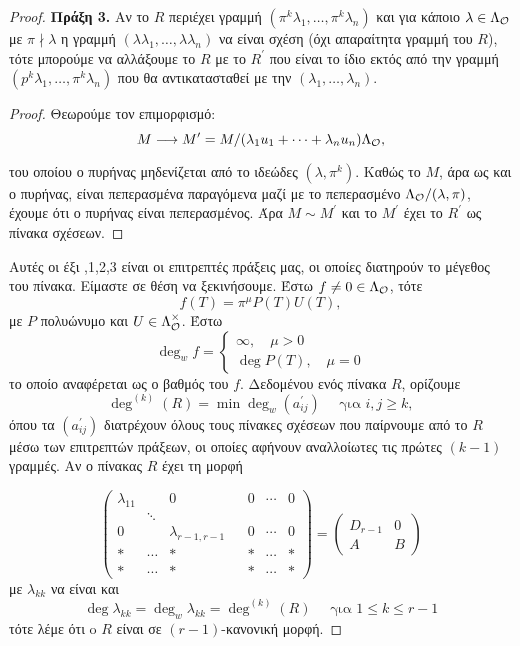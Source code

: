 \begin{proof}
\noindent \textbf{Πράξη 3.} Αν το $R$ περιέχει γραμμή $(\pi^k \lambda_1,\ldots, \pi^k \lambda_n)$ και για κάποιο $\lambda \in \Lambda_\mathcal{O}$ με $\pi\nmid \lambda$ η γραμμή $(\lambda \lambda_1,\ldots, \lambda \lambda_n)$ να είναι σχέση (όχι απαραίτητα γραμμή του $R$), τότε μπορούμε να αλλάξουμε το $R$ με το $R^\prime$ που είναι το ίδιο εκτός από την γραμμή $(p^k \lambda_1,\ldots, \pi^k \lambda_n)$ που θα αντικατασταθεί με την $(\lambda_1,\ldots, \lambda_n)$.

\begin{proof} Θεωρούμε τον επιμορφισμό:
    $$M \longrightarrow M^{\prime} = M/(\lambda_1 u_1 + \cdots + \lambda_n u_n) \Lambda_\mathcal{O} , $$

    \noindent του οποίου ο πυρήνας μηδενίζεται από το ιδεώδες $(\lambda, \pi^k)$. Καθώς το $M$, άρα ως  και ο πυρήνας, είναι πεπερασμένα παραγόμενα μαζί με το πεπερασμένο $\Lambda_\mathcal{O}/(\lambda, \pi)$, έχουμε ότι ο πυρήνας είναι πεπερασμένος. Άρα $M\sim M^\prime$ και το $M^\prime$ έχει το $R^\prime$ ως πίνακα σχέσεων.
\end{proof}

\noindent Αυτές οι έξι ,1,2,3 είναι οι επιτρεπτές πράξεις μας, οι οποίες διατηρούν το μέγεθος του πίνακα. Είμαστε σε θέση να ξεκινήσουμε. Έστω $f\neq 0 \in \Lambda_\mathcal{O}$, τότε
$$f(T) = \pi^\mu P(T)U(T) ,$$ με $P$  πολυώνυμο και $U \in \Lambda_\mathcal{O}^\times$. Έστω 
$$\deg_w f = \begin{cases}
    \infty, \quad \mu > 0 \\
    \deg P(T), \quad \mu = 0
\end{cases}$$
το οποίο αναφέρεται ως ο βαθμός  του $f$. Δεδομένου ενός πίνακα $R$, ορίζουμε
$$\deg^{(k)}(R) = \min \deg_w (a^\prime_{ij}) \quad \text{ για } i,j \geq k ,$$ όπου τα $(a^\prime_{ij})$ διατρέχουν όλους τους πίνακες σχέσεων που παίρνουμε από το $R$ μέσω των επιτρεπτών πράξεων, οι οποίες αφήνουν αναλλοίωτες τις πρώτες $(k-1)$ γραμμές. Αν ο πίνακας $R$ έχει τη μορφή

$$\begin{pmatrix}
    \lambda_{11} & & 0 & & 0 & \cdots & 0 \\ 
    & \ddots& & & & &  \\
    0 & & \lambda_{r-1, r-1} & & 0 & \cdots & 0 \\
    * & \cdots & * & & * & \cdots & * \\ 
    * & \cdots & * & & * & \cdots & * 
\end{pmatrix} = \begin{pmatrix}
    D_{r-1} & 0 \\ 
    A & B
\end{pmatrix}$$ με $\lambda_{kk}$ να είναι  και 
$$\deg \lambda_{kk} = \deg_w \lambda_{kk} = \deg^{(k)}(R) \quad \text{ για } 1\leq k \leq r-1$$
τότε λέμε ότι o $R$ είναι σε $(r-1)$-κανονική μορφή.


\end{proof}
